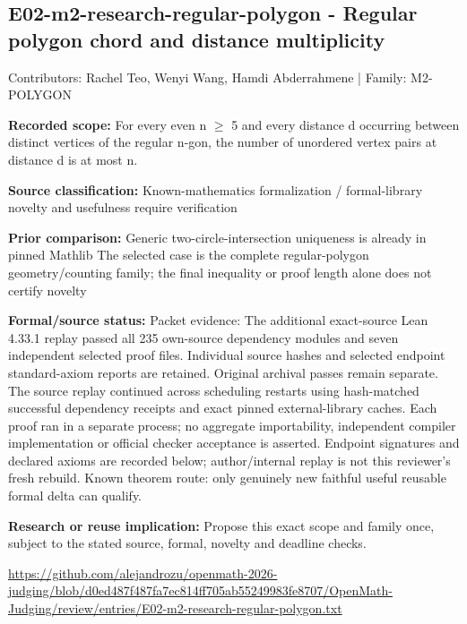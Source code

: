 \documentclass[11pt,a4paper]{article}
\begin{document}
\begin{samepage}
\subsection{E02-m2-research-regular-polygon  -  Regular polygon chord and distance multiplicity}
{\small Contributors: Rachel Teo, Wenyi Wang, Hamdi Abderrahmene | Family: M2-POLYGON\par}

\textbf{Recorded scope:} For every even n \ensuremath{\geq} 5 and every distance d occurring between distinct vertices of the regular n-gon, the number of unordered vertex pairs at distance d is at most n.

\end{samepage}
\textbf{Source classification:} Known-mathematics formalization / formal-library novelty and usefulness require verification

\textbf{Prior comparison:} Generic two-circle-intersection uniqueness is already in pinned Mathlib The selected case is the complete regular-polygon geometry/counting family; the final inequality or proof length alone does not certify novelty

\textbf{Formal/source status:} Packet evidence: The additional exact-source Lean 4.33.1 replay passed all 235 own-source dependency modules and seven independent selected proof files. Individual source hashes and selected endpoint standard-axiom reports are retained. Original archival passes remain separate. The source replay continued across scheduling restarts using hash-matched successful dependency receipts and exact pinned external-library caches. Each proof ran in a separate process; no aggregate importability, independent compiler implementation or official checker acceptance is asserted. Endpoint signatures and declared axioms are recorded below; author/internal replay is not this reviewer's fresh rebuild. Known theorem route: only genuinely new faithful useful reusable formal delta can qualify.

\textbf{Research or reuse implication:} Propose this exact scope and family once, subject to the stated source, formal, novelty and deadline checks.

{\small \url{https://github.com/alejandrozu/openmath-2026-judging/blob/d0ed487f487fa7ec814ff705ab55249983fe8707/OpenMath-Judging/review/entries/E02-m2-research-regular-polygon.txt}\par}
\end{document}
